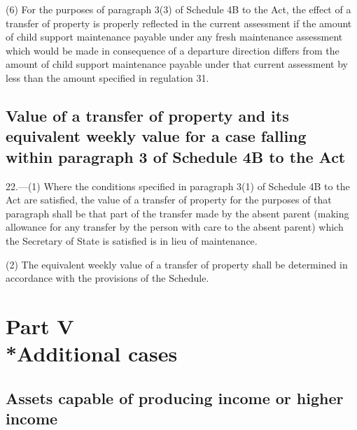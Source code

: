 \documentclass[a4paper]{article}
\newcommand{\parthead}{}
\begin{document}
(6) For the purposes of paragraph 3(3) of Schedule 4B to the Act, the effect of a transfer of property is properly reflected in the current assessment if the amount of child support maintenance payable under any fresh maintenance assessment which would be made in consequence of a departure direction differs from the amount of child support maintenance payable under that current assessment by less than the amount specified in regulation 31.

\subsection[22. Value of a transfer of property and its equivalent weekly value for a case falling within paragraph 3 of Schedule 4B to the Act]{Value of a transfer of property and its equivalent weekly value for a case falling within paragraph 3 of Schedule 4B to the Act}

22.—(1) Where the conditions specified in paragraph 3(1) of Schedule 4B to the Act are satisfied, the value of a transfer of property for the purposes of that paragraph shall be that part of the transfer made by the absent parent (making allowance for any transfer by the person with care to the absent parent) which the Secretary of State is satisfied is in lieu of maintenance.

(2) The equivalent weekly value of a transfer of property shall be determined in accordance with the provisions of the Schedule.

\section[Part V --- Additional cases]{Part V\\*Additional cases}

\subsection[23. Assets capable of producing income or higher income]{Assets capable of producing income or higher income}

\renewcommand\parthead{--- Part V}
\end{document}
